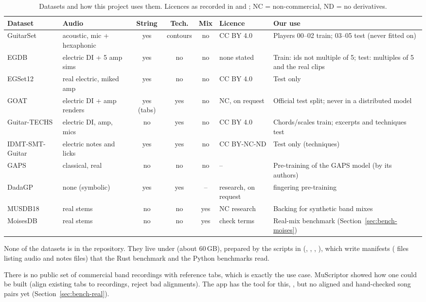 \begin{table}[h]
\centering
\caption{Datasets and how this project uses them. Licences as recorded in
 and ; NC =
non-commercial, ND = no derivatives.}
\label{tab:datasets}
\small
\begin{tabularx}{\textwidth}{@{}>{\raggedright}p{2.3cm}>{\raggedright}p{3.0cm}ccc>{\raggedright}p{2.0cm}X@{}}
\toprule
Dataset & Audio & String & Tech. & Mix & Licence & Our use \\
\midrule
GuitarSet & acoustic, mic + hexaphonic & yes & contours & no & CC BY 4.0 & Players 00--02 train; 03--05 test (never fitted on) \\
EGDB & electric DI + 5 amp sims & yes & no & no & none stated & Train: ids not multiple of 5; test: multiples of 5 and the real clips \\
EGSet12 & real electric, miked amp & yes & no & no & CC BY 4.0 & Test only \\
GOAT & electric DI + amp renders & yes (tabs) & yes & no & NC, on request & Official test split; never in a distributed model \\
Guitar-TECHS & electric DI, amp, mics & no & yes & no & CC BY 4.0 & Chords/scales train; excerpts and techniques test \\
IDMT-SMT-Guitar & electric notes and licks & yes & yes & no & CC BY-NC-ND & Test only (techniques) \\
GAPS & classical, real & no & no & no & -- & Pre-training of the GAPS model (by its authors) \\
DadaGP & none (symbolic) & yes & yes & -- & research, on request & \planned{} fingering pre-training \\
MUSDB18 & real stems & no & no & yes & NC research & Backing for synthetic band mixes \\
MoisesDB & real stems & no & no & yes & check terms & Real-mix benchmark (Section~\ref{sec:bench-moises}) \\
\bottomrule
\end{tabularx}
\end{table}

\begin{inapp}
None of the datasets is in the repository. They live under
 (about 60\,GB), prepared by the scripts in
 (, ,
, ), which write manifests
( files listing audio and notes files) that the Rust benchmark
 and the Python benchmarks read.
\end{inapp}

\begin{caution}
There is no public set of commercial band recordings with reference tabs, which
is exactly the use case. MuScriptor showed how one could be built (align
existing tabs to recordings, reject bad alignments). The app has the tool for
this,  \done, but no aligned and hand-checked
song pairs yet (Section~\ref{sec:bench-real}).
\end{caution}
